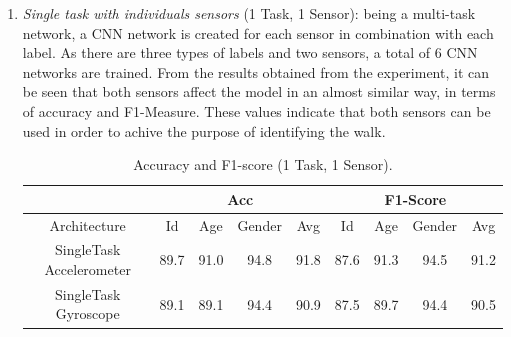 \begin{enumerate}
    \item \emph{Single task with individuals sensors} (1 Task, 1 Sensor): being a multi-task 
    network, a CNN network is created for each sensor in combination 
    with each label. As there are three types of labels and two sensors, a 
    total of 6 CNN networks are trained. From the results obtained from 
    the experiment, it can be seen that both sensors affect the model in an 
    almost similar way, in terms of accuracy and F1-Measure. These values 
    indicate that both sensors can be used in order to achive the purpose 
    of identifying the walk.
    \begin{table}[h!]
        \centering
        \begin{adjustbox}{max width=\textwidth}
        \begin{tabular}{|c||ccc|c||ccc|c|}
            \hline
                & \multicolumn{4}{c||}{Acc} & \multicolumn{4}{c|}{F1-Score} \\
            \hline
                Architecture & Id & Age & Gender & Avg & Id & Age & Gender & Avg\\
            \hline
                SingleTask Accelerometer & 89.7 & 91.0 & 94.8 & 91.8 & 87.6 & 91.3 & 94.5 & 91.2\\
                SingleTask Gyroscope& 89.1 & 89.1 & 94.4 & 90.9 & 87.5 & 89.7 & 94.4 & 90.5\\
            \hline 
        \end{tabular}
        \end{adjustbox}
        \caption{Accuracy and F1-score (1 Task, 1 Sensor).}
        \label{table accuracy and F1 (1 Task - 1 Sensor)}
    \end{table}


\end{enumerate}
